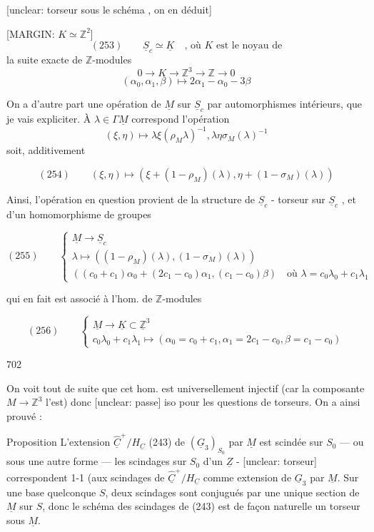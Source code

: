 [unclear: torseur sous le schéma , on en déduit]

[MARGIN: $K \simeq \mathbb{Z}^2$]
$$ (253) \qquad \underline{S}_c \simeq \underline{K} \quad \text{, où } K \text{ est le noyau de} $$
la suite exacte de
$\mathbb{Z}$-modules
$$ 0 \longrightarrow K \longrightarrow \mathbb{Z}^3 \longrightarrow \mathbb{Z} \longrightarrow 0 $$
$$ (\alpha_0, \alpha_1, \beta) \longmapsto 2\alpha_1 - \alpha_0 - 3\beta $$

On a d'autre part une opération
de $\underline{M}$ sur $\underline{S}_c$ par automorphismes intérieurs,
que je vais expliciter. À $\lambda \in \Gamma\underline{M}$
correspond l'opération
$$ (\xi, \eta) \longmapsto \lambda \xi (\rho_M \lambda)^{-1}, \lambda \eta \sigma_M(\lambda)^{-1} $$
soit, additivement

$$ (254) \qquad (\xi, \eta) \longmapsto ( \xi + (1 - \rho_M)(\lambda), \eta + (1 - \sigma_M)(\lambda) ) $$

Ainsi, l'opération en question provient de
la structure de $\underline{S}_c$ - torseur sur
$\underline{S}_c$ , et d'un homomorphisme de
groupes

$$ (255) \qquad \begin{cases} \underline{M} \longrightarrow \underline{S}_c \\ \lambda \longmapsto ( (1 - \rho_M)(\lambda), (1 - \sigma_M)(\lambda) ) \\ ((c_0+c_1)\alpha_0 + (2c_1-c_0)\alpha_1, (c_1-c_0)\beta) \quad \text{où } \lambda = c_0\lambda_0 + c_1\lambda_1 \end{cases} $$

qui en fait est associé à l'hom. de $\mathbb{Z}$-modules

$$ (256) \qquad \begin{cases} \underline{M} \longrightarrow \underline{K} \subset \underline{\mathbb{Z}}^3 \\ c_0\lambda_0 + c_1\lambda_1 \longmapsto (\alpha_0 = c_0+c_1, \alpha_1 = 2c_1-c_0, \beta = c_1-c_0) \end{cases} $$

\newpage


702

On voit tout de suite que cet hom. est
universellement injectif (car la composante
$M \to \mathbb{Z}^3$ l'est) donc [unclear: passe] iso pour les
questions de torseurs. On a ainsi prouvé :

Proposition L'extension $\underline{\widehat{C}}^+ / H_{\underline{C}}$ (243) de
$(\underline{G}_3)_{S_0}$ par $\underline{M}$ est scindée sur $S_0$
— ou sous une autre forme — les scindages
sur $S_0$ d'un $\underline{Z}$ - [unclear: torseur] correspondent 1-1 (aux
scindages de $\underline{\widehat{C}}^+ / H_{\underline{C}}$ comme
extension de $\underline{G}_3$ par $\underline{M}$. Sur une
base quelconque $S$, deux scindages
sont conjugués par une unique
section de $\underline{M}$ sur $S$, donc le schéma
des scindages de (243) est de
façon naturelle un torseur sous $\underline{M}$.


